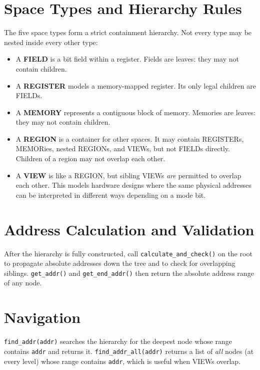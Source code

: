 \documentclass[11pt,letterpaper]{report}
\begin{document}
\section*{Space Types and Hierarchy Rules}

The five space types form a strict containment hierarchy.  Not every type
may be nested inside every other type:

\begin{itemize}
  \item A \textbf{FIELD} is a bit field within a register.  Fields are
        leaves: they may not contain children.
  \item A \textbf{REGISTER} models a memory-mapped register.  Its only
        legal children are FIELDs.
  \item A \textbf{MEMORY} represents a contiguous block of memory.
        Memories are leaves: they may not contain children.
  \item A \textbf{REGION} is a container for other spaces.  It may
        contain REGISTERs, MEMORies, nested REGIONs, and VIEWs, but
        not FIELDs directly.  Children of a region may not overlap
        each other.
  \item A \textbf{VIEW} is like a REGION, but sibling VIEWs \emph{are}
        permitted to overlap each other.  This models hardware designs
        where the same physical addresses can be interpreted in different
        ways depending on a mode bit.
\end{itemize}

\section*{Address Calculation and Validation}

After the hierarchy is fully constructed, call
\texttt{calculate\_and\_check()} on the root to propagate absolute
addresses down the tree and to check for overlapping siblings.
\texttt{get\_addr()} and \texttt{get\_end\_addr()} then return the
absolute address range of any node.

\section*{Navigation}

\texttt{find\_addr(addr)} searches the hierarchy for the deepest node
whose range contains \texttt{addr} and returns it.
\texttt{find\_addr\_all(addr)} returns a list of \emph{all} nodes (at
every level) whose range contains \texttt{addr}, which is useful when
VIEWs overlap.
\end{document}

